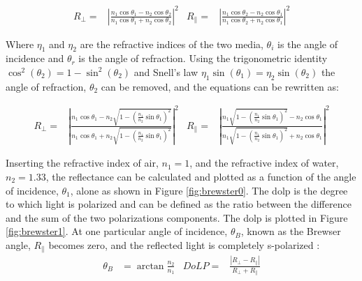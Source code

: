 \begin{align}
    R_\perp =         & \left|{\frac {n_{1}\cos \theta _1-n_{2}\cos \theta _2}{n_{1}\cos \theta _1+n_{2}\cos \theta _2}}\right|^{2}
                      & 
    R_\parallel     = & \left|{\frac {n_{1}\cos \theta _2-n_{2}\cos \theta _1}{n_{1}\cos \theta _2+n_{2}\cos \theta _1}}\right|^{2}
\end{align}

Where  $\eta_1$ and $\eta_2$ are the refractive indices of the two media,
$\theta_i$ is the angle of incidence and $\theta_r$ is the angle of refraction.
Using the trigonometric identity $ \cos^2{\left(\theta_2 \right)} = 1- \sin^2{\left(\theta_2 \right)}$ and Snell's law $\eta_1 \sin{\left(\theta_1 \right)} = \eta_2 \sin{\left(\theta_2 \right)}$ the angle of refraction, $\theta_2$ can be removed, and the equations can be rewritten as:

\begin{align}
    R_\perp =         & \left|{\frac {n_{1}\cos \theta _1-n_{2}{\sqrt {1-\left({\frac {n_{1}}{n_{2}}}\sin \theta _1\right)^{2}}}}{n_{1}\cos \theta _1+n_{2}{\sqrt {1-\left({\frac {n_{1}}{n_{2}}}\sin \theta _1\right)^{2}}}}}\right|^{2}
                      & 
    R_\parallel     = & \left|{\frac {n_{1}{\sqrt {1-\left({\frac {n_{1}}{n_{2}}}\sin \theta _1\right)^{2}}}-n_{2}\cos \theta _1}{n_{1}{\sqrt {1-\left({\frac {n_{1}}{n_{2}}}\sin \theta _1\right)^{2}}}+n_{2}\cos \theta _1}}\right|^{2}
\end{align}


Inserting the refractive index of air, $n_1 = 1$, and the refractive index of water, $n_2 = 1.33$, the reflectance can be calculated and plotted as a function of the angle of incidence, $\theta_1$, alone as shown in Figure \ref{fig:brewster0}.
The \gls{dolp} is the degree to which light is polarized and can be defined as the ratio between the difference and the sum of the two polarizations components.
The \gls{dolp} is plotted in Figure \ref{fig:brewster1}.
At one particular angle of incidence, $\theta_B$, known as the Brewser angle, $R_\parallel$ becomes zero, and the reflected light is completely s-polarized \cite{BrewsterAngle2024}:
\begin{align}
    \theta_B & = \arctan{\frac{n_2}{n_1}} & DoLP= & \frac{\left | R_\perp - R_\parallel \right |}{R_\perp + R_\parallel}
\end{align}

